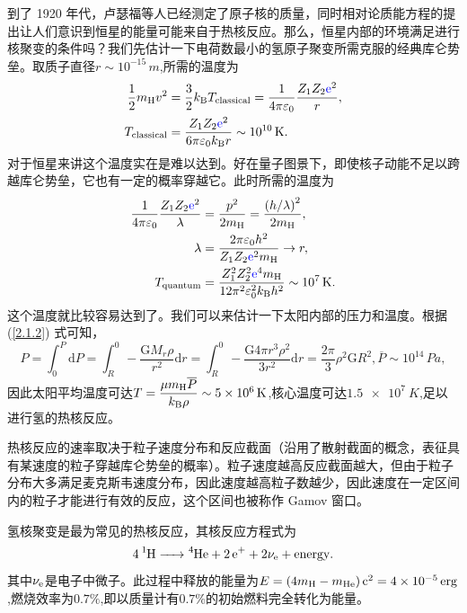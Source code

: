 \documentclass[../天体物理基础.tex]{subfiles}
\begin{document}
到了 1920 年代，卢瑟福等人已经测定了原子核的质量，同时相对论质能方程的提出让人们意识到恒星的能量可能来自于热核反应。那么，恒星内部的环境满足进行核聚变的条件吗？我们先估计一下电荷数最小的氢原子聚变所需克服的经典库仑势垒。取质子直径$r\sim10^{-15}\,\unit{m}$,所需的温度为
\begin{align}
\frac{1}{2}m_{\ce{H}}v^{2}&=\frac{3}{2}k_{\text{B}}T_{\text{classical}}=\frac{1}{4\pi\varepsilon_{0}}\frac{Z_{1}Z_{2}{\color{blue}{\ce{e}}}^{2}}{r},\\
T_{\text{classical}}&=\frac{Z_{1}Z_{2}{\color{blue}{\ce{e}}}^{2}}{6\pi\varepsilon_{0}k_{\text{B}}r}\sim10^{10}\,\unit{K}.
\end{align}
对于恒星来讲这个温度实在是难以达到。好在量子图景下，即使核子动能不足以跨越库仑势垒，它也有一定的概率穿越它。此时所需的温度为
\begin{align}
\frac{1}{4\pi\varepsilon_{0}}\frac{Z_{1}Z_{2}{\color{blue}{\ce{e}}}^{2}}{\lambda}&=\frac{p^{2}}{2m_{\ce{H}}}=\frac{\left(h/\lambda\right)^{2}}{2m_{\ce{H}}},\\
\lambda&=\frac{2\pi\varepsilon_{0}h^{2}}{Z_{1}Z_{2}{\color{blue}{\ce{e}}}^{2}m_{\ce{H}}}\to r,\\
T_{\text{quantum}}&=\frac{Z_{1}^{2}Z_{2}^{2}{\color{blue}{\ce{e}}}^{4}m_{\ce{H}}}{12\pi^{2}\varepsilon_{0}^{2}k_{\text{B}}h^{2}}\sim10^{7}\,\unit{K}.
\end{align}
这个温度就比较容易达到了。我们可以来估计一下太阳内部的压力和温度。根据 (\ref{2.1.2}) 式可知，
\begin{equation}
P=\int_{0}^{P}\mathrm{d}P=\int_{R}^{0}-\frac{\mathrm{G}M_{r}\rho}{r^{2}}\mathrm{d}r=\int_{R}^{0}-\frac{\mathrm{G}4\pi{}r^{3}\rho^{2}}{3r^{2}}\mathrm{d}r=\frac{2\pi{}}{3}\rho^{2}\mathrm{G}R^{2},\overline{P}\sim10^{14}\,\unit{Pa},
\end{equation}
因此太阳平均温度可达$T=\dfrac{\mu m_{\ce{H}}\overline{P}}{k_{\text{B}}\rho}\sim\qty{5e6}{K}$,核心温度可达$\qty{1.5e7}{K}$,足以进行氢的热核反应。

热核反应的速率取决于粒子速度分布和反应截面（沿用了散射截面的概念，表征具有某速度的粒子穿越库仑势垒的概率）。粒子速度越高反应截面越大，但由于粒子分布大多满足麦克斯韦速度分布，因此速度越高粒子数越少，因此速度在一定区间内的粒子才能进行有效的反应，这个区间也被称作 Gamov 窗口。

氢核聚变是最为常见的热核反应，其核反应方程式为
\begin{equation}
\ce{4{}^{1}H ->{}^{4}He +2e^{+}}+2\nu_{\ce{e}}+\text{energy}.
\end{equation}
其中$\nu_{\ce{e}}$是电子中微子。此过程中释放的能量为$E=\left(4m_{\ce{H}}-m_{\ce{He}}\right)\mathrm{c}^{2}=\qty{4e-5}{erg}$,燃烧效率为$0.7\%$,即以质量计有$0.7\%$的初始燃料完全转化为能量。
\end{document}
